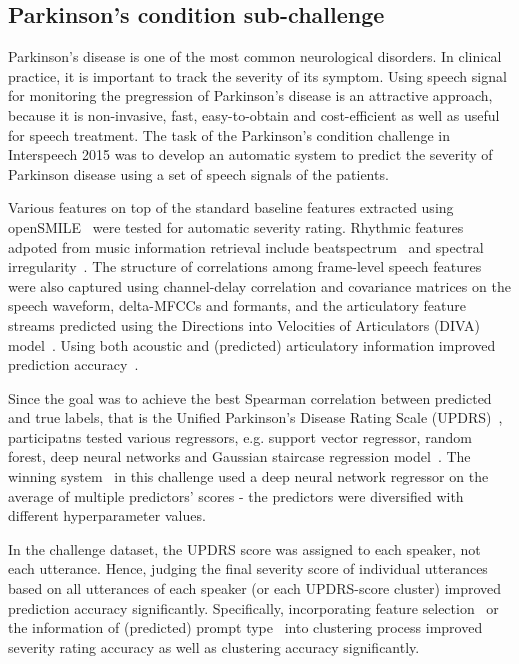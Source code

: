 \documentclass{article}
\begin{document}
\subsection{Parkinson's condition sub-challenge}
Parkinson's disease is one of the most common neurological disorders.
In clinical practice, it is important to track the severity of its symptom.
Using speech signal for monitoring the pregression of Parkinson's disease is an attractive approach, because it is non-invasive, fast, easy-to-obtain and cost-efficient as well as useful for speech treatment.
The task of the Parkinson's condition challenge in Interspeech 2015 was to develop an automatic system to predict the severity of Parkinson disease using a set of speech signals of the patients.

Various features on top of the standard baseline features extracted using openSMILE~\cite{eyben2010themunich} were tested for automatic severity rating.
Rhythmic features adpoted from music information retrieval include beatspectrum~\cite{foote2002audio} and spectral irregularity~\cite{jensen1999timbre}.
The structure of correlations among frame-level speech features were also captured using channel-delay correlation and covariance matrices on the speech waveform, delta-MFCCs and formants, and the articulatory feature streams predicted using the Directions into Velocities of Articulators (DIVA) model~\cite{guenther2006neural,williamson2015segment}.
Using both acoustic and (predicted) articulatory information improved prediction accuracy~\cite{hahm2015parkinson}.

Since the goal was to achieve the best Spearman correlation between predicted and true labels, that is the Unified Parkinson's Disease Rating Scale (UPDRS)~\cite{stebbins1998factor}, participatns tested various regressors, e.g. support vector regressor, random forest, deep neural networks and Gaussian staircase regression model~\cite{williamson2013vocal}. The winning system~\cite{grosz2015assessing} in this challenge used a deep neural network regressor on the average of multiple predictors' scores - the predictors were diversified with different hyperparameter values. 

In the challenge dataset, the UPDRS score was assigned to each speaker, not each utterance.
Hence, judging the final severity score of individual utterances based on all utterances of each speaker (or each UPDRS-score cluster) improved prediction accuracy significantly.
Specifically, incorporating feature selection~\cite{grosz2015assessing} or the information of (predicted) prompt type~\cite{kim2015automatic} into clustering process improved severity rating accuracy as well as clustering accuracy significantly.
\end{document}
